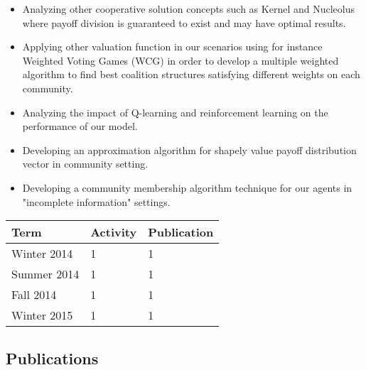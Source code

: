 \begin{itemize}
\item Analyzing other cooperative solution concepts such as Kernel
and Nucleolus where payoff division is guaranteed to exist and may
have optimal results.

\item Applying other valuation function in our scenarios using for
instance Weighted Voting Games (WCG) in order to develop a
multiple weighted algorithm to find best coalition structures
satisfying different weights on each community.

\item Analyzing the impact of Q-learning and reinforcement
learning on the performance of our model.

\item Developing an approximation algorithm for shapely value
payoff distribution vector in community setting.

\item Developing a community membership algorithm technique for
our agents in "incomplete information" settings.

\end{itemize}


\begin{center}
    \begin{tabular}{ | l | l | p{5cm} |}
    \hline
    Term & Activity & Publication \\ \hline
    Winter 2014 & 1 & 1 \\ \hline
    Summer 2014 & 1 & 1 \\ \hline
    Fall 2014 & 1 & 1 \\ \hline
    Winter 2015 & 1 & 1 \\
    \hline
    \end{tabular}
\end{center}


\subsection {Publications }

